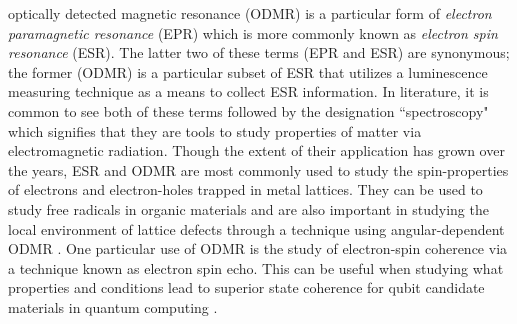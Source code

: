 \documentclass[oneside, noacknowlegments]{BYUPhys}
\begin{document}
optically detected magnetic resonance (ODMR) is a particular form of \textit{electron paramagnetic resonance} (EPR) which is more commonly known as \textit{electron spin resonance} (ESR). The latter two of these terms (EPR and ESR) are synonymous; the former (ODMR) is a particular subset of ESR that utilizes a luminescence measuring technique as a means to collect ESR information. In literature, it is common to see both of these terms followed by the designation ``spectroscopy" which signifies that they are tools to study properties of matter via electromagnetic radiation. Though the extent of their application has grown over the years, ESR and ODMR are most commonly used to study the spin-properties of electrons and electron-holes trapped in metal lattices. They can be used to study free radicals in organic materials \cite{RefWorks:doc:589299ede4b0dec22aee3bd4} and are also important in studying the local environment of lattice defects through a technique using angular-dependent ODMR \cite{RefWorks:doc:58929264e4b0d4c09201f63b}. One particular use of ODMR is the study of electron-spin coherence via a technique known as electron spin echo. This can be useful when studying what properties and conditions lead to superior state coherence for qubit candidate materials in quantum computing \cite{RefWorks:doc:58929786e4b0228a292929b8}.
\end{document}
